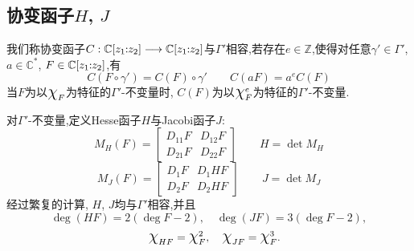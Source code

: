 \subsection{协变函子$H$, $J$}
\begin{defn}
	我们称协变函子$C: \mathbb{C} [z_1\hspace{-3pt}:\hspace{-3pt}z_2] \longrightarrow \mathbb{C} [z_1\hspace{-3pt}:\hspace{-3pt}z_2]$与$\Gamma'$相容,若存在$e\in \mathbb{Z}$,使得对任意$\gamma' \in \Gamma'$, $a \in \mathbb{C}^*$, $F \in \mathbb{C} [z_1\hspace{-3pt}:\hspace{-3pt}z_2]$,有
	$$C(F \circ \gamma')= C(F) \circ \gamma' \qquad C(aF)=a^eC(F)$$
	当$F$为以$\mbox{\Large$\chi$}_F$为特征的$\Gamma'$-不变量时, $C(F)$为以$\mbox{\Large$\chi$}_F^e$为特征的$\Gamma'$-不变量.
\end{defn}
\begin{example1}
	对$\Gamma'$-不变量,定义Hesse函子$H$与Jacobi函子$J$:
	$$M_H(F)= \begin{bmatrix}
	D_{11}F & D_{12}F \\ D_{21}F & D_{22}F 
	\end{bmatrix} 	\qquad H=\det M_H$$
	$$M_J(F)= \begin{bmatrix}
	D_{1}F & D_{1}HF \\D_{2}F & D_{2}HF
	\end{bmatrix} 	\qquad J=\det M_J$$
	经过繁复的计算, $H$, $J$均与$\Gamma'$相容,并且
	$$\deg (HF)=2(\deg F-2), \quad \deg(JF)=3(\deg F-2),$$
	$$ \quad \mbox{\Large$\chi$}_{HF}=\mbox{\Large$\chi$}_F^2, \quad \mbox{\Large$\chi$}_{JF}=\mbox{\Large$\chi$}_F^3. $$
\end{example1}
